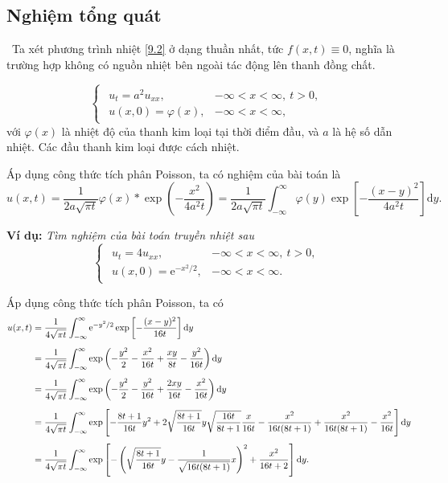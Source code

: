 \documentclass[10pt, a4paper]{article}
\begin{document}
	\subsection{Nghiệm tổng quát}
	\vspace{2mm}
	\quad\,\,\,Ta xét phương trình nhiệt \ref{9.2} ở dạng thuần nhất, tức $f(x,t)\equiv0$, nghĩa là trường hợp không có nguồn nhiệt bên ngoài tác động lên thanh đồng chất.
	\vspace{2mm}
	\begin{tcolorbox}[enhanced,colback=blue!5!white,colframe=blue!75!black,sharp corners=all,shadow={0mm}{0mm}{-1.5mm}%
		{fill=blue!75!red,opacity=0.3},title=\textbf{Dạng của bài toán}]
		$$\begin{cases}
			\begin{array}{ll}
				u_t=a^2u_{xx}, & -\infty<x<\infty,~t>0,\\
				u(x,0)=\varphi(x), & -\infty<x<\infty,
			\end{array}
		\end{cases}$$
		với $\varphi(x)$ là nhiệt độ của thanh kim loại tại thời điểm đầu, và $a$ là hệ số dẫn nhiệt. Các đầu thanh kim loại được cách nhiệt.
	\end{tcolorbox}
	\vspace{2mm}
	Áp dụng công thức tích phân Poisson, ta có nghiệm của bài toán là $$u(x,t)=\dfrac{1}{2a\sqrt{\pi t}}\varphi(x)*\exp\left(-\frac{x^2}{4a^2t}\right)=\dfrac{1}{2a\sqrt{\pi t}}\displaystyle\int_{-\infty}^\infty\varphi(y)\exp\left[-\frac{(x-y)^2}{4a^2t}\right]\text{d}y.$$
	
	\textbf{Ví dụ:} \textit{Tìm nghiệm của bài toán truyền nhiệt sau} $$\begin{cases}
		\begin{array}{ll}
			u_t=4u_{xx}, & -\infty<x<\infty,~t>0,\\
			u(x,0)=\mathrm e^{-x^2/2}, & -\infty<x<\infty.
		\end{array}
	\end{cases}$$
	
	Áp dụng công thức tích phân Poisson, ta có \begin{align*}
		u(x,t)&=\frac{1}{4\sqrt{\pi t}}\int_{-\infty}^\infty\mathrm e^{-y^2/2}\exp\left[-\frac{(x-y)^2}{16t}\right]\mathrm dy\\
		\noalign{\vskip5pt}
		&=\frac{1}{4\sqrt{\pi t}}\int_{-\infty}^\infty\exp\left(-\frac{y^2}{2}-\frac{x^2}{16t}+\frac{xy}{8t}-\frac{y^2}{16t}\right)\mathrm dy\\
		\noalign{\vskip5pt}
		&=\frac{1}{4\sqrt{\pi t}}\int_{-\infty}^\infty\exp\left(-\frac{y^2}{2}-\frac{y^2}{16t}+\frac{2xy}{16t}-\frac{x^2}{16t}\right)\mathrm dy\\
		\noalign{\vskip5pt}
		&=\frac{1}{4\sqrt{\pi t}}\int_{-\infty}^\infty\exp\left[-\frac{8t+1}{16t}y^2+2\sqrt{\frac{8t+1}{16t}}y\sqrt{\frac{16t}{8t+1}}\frac{x}{16t}-\frac{x^2}{16t(8t+1)}+\frac{x^2}{16t(8t+1)}-\frac{x^2}{16t}\right]\mathrm dy\\
		\noalign{\vskip4pt}
		&=\frac{1}{4\sqrt{\pi t}}\int_{-\infty}^\infty\exp\left[-\left(\sqrt{\frac{8t+1}{16t}}y-\frac{1}{\sqrt{16t(8t+1)}}x\right)^2+\frac{x^2}{16t+2}\right]\mathrm dy.
	\end{align*}
	
\end{document}
